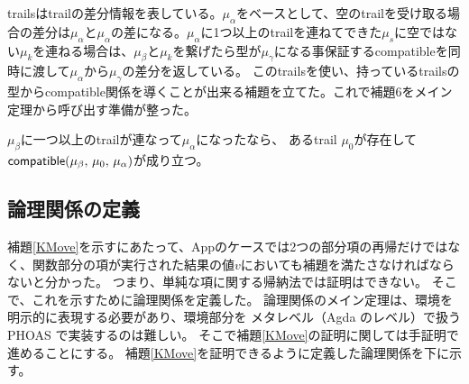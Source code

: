 trailsはtrailの差分情報を表している。$\mu_{\alpha}$をベースとして、空のtrailを受け取る場合の差分は$\mu_{\alpha}$と$\mu_{\alpha}$の差になる。$\mu_{\alpha}$に1つ以上のtrailを連ねてできた$\mu_s$に空ではない$\mu_k$を連ねる場合は、$\mu_{\beta}$と$\mu_k$を繋げたら型が$\mu_{\gamma}$になる事保証する\textsf{compatible}を同時に渡して$\mu_{\alpha}$から$\mu_{\gamma}$の差分を返している。
このtrailsを使い、持っているtrailsの型から\textsf{compatible}関係を導くことが出来る補題を立てた。これで補題6をメイン定理から呼び出す準備が整った。
\begin{lemma}\upshape
  $\mu_{\beta}$に一つ以上のtrailが連なって$\mu_{\alpha}$になったなら、
 あるtrail $\mu_0$が存在して
 $\textsf{compatible}(\mu_{\beta},\,\mu_0,\,\mu_{\alpha})$が成り立つ。
\end{lemma}


\subsection{論理関係の定義}
補題\ref{KMove}を示すにあたって、Appのケースでは2つの部分項の再帰だけではなく、関数部分の項が実行された結果の値$v$においても補題を満たさなければならないと分かった。
つまり、単純な項に関する帰納法では証明はできない。
そこで、これを示すために論理関係を定義した。
論理関係のメイン定理は、環境を明示的に表現する必要があり、環境部分を
メタレベル（Agda のレベル）で扱うPHOAS \cite{chlipala-phoas}
で実装するのは難しい。
そこで補題\ref{KMove}の証明に関しては手証明で進めることにする。
補題\ref{KMove}を証明できるように定義した論理関係を下に示す。

